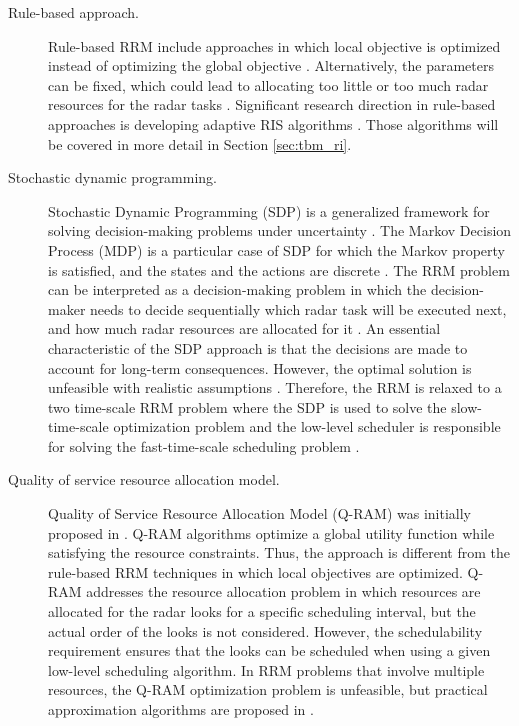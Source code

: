 \documentclass[english, 12pt, a4paper, elec, utf8, a-1b, online]{aaltothesis}
\numberwithin{equation}{section}
\begin{document}
\begin{description}

\item[Rule-based approach.]

Rule-based RRM include approaches in which local objective is optimized instead of optimizing the global objective \cite{Koch1999}.
Alternatively, the parameters can be fixed, which could lead to allocating too little or too much radar resources for the radar tasks \cite{Hoffmann2014}.
Significant research direction in rule-based approaches is developing adaptive RIS algorithms \cite{Cohen1986, Gardner1988, Munu1992, ChengTing2007, Baek2010, Watson1993, Charlish2015, Keuk1975, Shin1995, Benoudnine2006}. Those algorithms will be covered in more detail in Section \ref{sec:tbm_ri}.


\item[Stochastic dynamic programming.]

Stochastic Dynamic Programming (SDP) is a generalized framework for solving decision-making problems under uncertainty \cite{Ross1983}. 
The Markov Decision Process (MDP) is a particular case of SDP for which the Markov property is satisfied, and the states and the actions are discrete \cite{Ross1983}.
The RRM problem can be interpreted as a decision-making problem in which the decision-maker needs to decide sequentially which radar task will be executed next, and how much radar resources are allocated for it \cite{Krishnamurthy2001, Wintenby2006, LaScala2006}.
An essential characteristic of the SDP approach is that the decisions are made to account for long-term consequences.
However, the optimal solution is unfeasible with realistic assumptions \cite{Wintenby2006}.
Therefore, the RRM is relaxed to a two time-scale RRM problem where the SDP is used to solve the slow-time-scale optimization problem and the low-level scheduler is responsible for solving the fast-time-scale scheduling problem \cite{Wintenby2006}.  


\item[Quality of service resource allocation model.] 

Quality of Service Resource Allocation Model (Q-RAM) was initially proposed in \cite{Rajkumar1997}.
Q-RAM algorithms optimize a global utility function while satisfying the resource constraints.
Thus, the approach is different from the rule-based RRM techniques in which local objectives are optimized.
Q-RAM addresses the resource allocation problem in which resources are allocated for the radar looks for a specific scheduling interval, but the actual order of the looks is not considered.
However, the schedulability requirement ensures that the looks can be scheduled when using a given low-level scheduling algorithm. 
In RRM problems that involve multiple resources, the Q-RAM optimization problem is unfeasible, but practical approximation algorithms are proposed in \cite{Rajkumar1998, Irci2010, Charlish2015a}.


\end{description}
\end{document}
